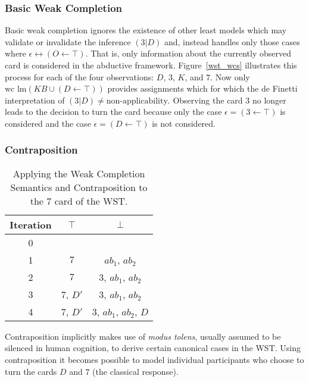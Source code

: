 \subsubsection*{Basic Weak Completion}

Basic weak completion ignores the existence of other least models which may validate or invalidate the inference $(3|D)$ and, instead handles only those cases where $\epsilon \leftrightarrow (O\leftarrow \top)$. That is, only information about the currently observed card is considered in the abductive framework. Figure~\ref{wst_wcs} illustrates this process for each of the four observations: $D$, $3$, $K$, and $7$. Now only $\textrm{wc lm}(KB \cup (D \leftarrow \top))$ provides assignments which for which the de Finetti interpretation of $(3|D)\neq \textrm{non-applicability}$. Observing the card $3$ no longer leads to the decision to turn the card because only the case $\epsilon = (3\leftarrow \top)$ is considered and the case $\epsilon = (D \leftarrow \top)$ is not considered.

\subsubsection*{Contraposition}
\begin{table}
\begin{center}
\begin{tabular}{ c c c }
 \textbf{Iteration} & \textbf{$\top$} & \textbf{$\bot$} \\ 
 \hline
 0 &  &  \\  
 1 &  $7$ & $ab_1$, $ab_2$  \\  
 2 &  $7$ & $3$, $ab_1$, $ab_2$  \\
 3 &  $7$, $D'$ & $3$, $ab_1$, $ab_2$  \\
 4 &  $7$, $D'$ & $3$, $ab_1$, $ab_2$, $D$  
\end{tabular}
\caption{Applying the Weak Completion Semantics and Contraposition to the $7$ card of the WST.}
\label{tbl:7cont}
\end{center}
\end{table}

Contraposition implicitly makes use of \textit{modus tolens}, usually assumed to be silenced in human cognition, to derive certain canonical cases in the WST. Using contraposition it becomes possible to model individual participants who choose to turn the cards $D$ and $7$ (the classical response).

